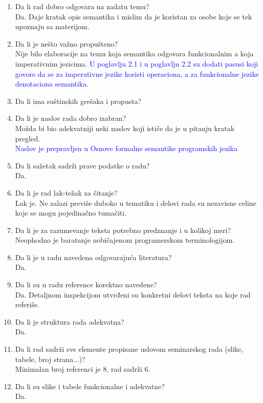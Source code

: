 \documentclass[a4paper]{report}
\newcommand{\odgovor}[1]{\textcolor{blue}{#1}}
\begin{document}
\begin{enumerate}
\item Da li rad dobro odgovara na zadatu temu?\\
Da. Daje kratak opis semantika i mislim da je koristan za osobe koje se tek upoznaju sa materijom.
\item Da li je nešto važno propušteno?\\
Nije bilo elaboracije na temu koja semantika odgovara funkcionalnim a koja imperativnim jezicima. 
\odgovor{U poglavlju 2.1 i u poglavlju 2.2 su dodati pasusi koji govore da se za imperativne jezike koristi operaciona, a za funkcionalne jezike denotaciona semantika.}
\item Da li ima suštinskih grešaka i propusta?\\
\item Da li je naslov rada dobro izabran?\\
Možda bi bio adekvatniji neki naslov koji ističe da je u pitanju kratak pregled.\\
\odgovor{Naslov je prepravljen u Osnove formalne semantike programskih jezika}
\item Da li sažetak sadrži prave podatke o radu?\\
Da.
\item Da li je rad lak-težak za čitanje?\\
Lak je. Ne zalazi previše duboko u tematiku i delovi rada su nezavisne celine koje se mogu pojedinačno tumačiti.
\item Da li je za razumevanje teksta potrebno predznanje i u kolikoj meri?\\
Neophodno je baratanje uobičajenom programerskom terminologijom.
\item Da li je u radu navedena odgovarajuća literatura?\\
Da.
\item Da li su u radu reference korektno navedene?\\
Da. Detaljnom inspekcijom utvrđeni su konkretni delovi teksta na koje rad referiše.
\item Da li je struktura rada adekvatna?\\
Da.
\item Da li rad sadrži sve elemente propisane uslovom seminarskog rada (slike, tabele, broj strana...)?\\
Minimalan broj referenci je 8, rad sadrži 6.
\item Da li su slike i tabele funkcionalne i adekvatne?\\
Da.
\end{enumerate}
\end{document}

